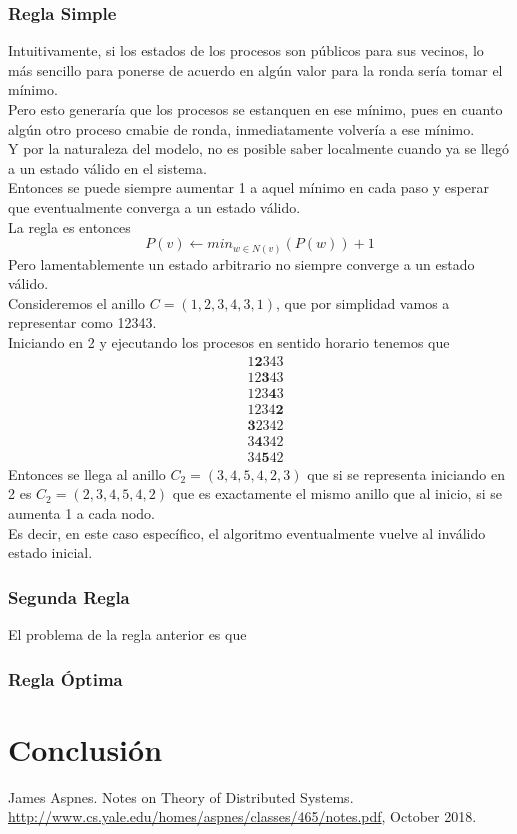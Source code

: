 \documentclass[12pt,a4paper]{article}
\begin{document}
{        \subsubsection{Regla Simple}{
        Intuitivamente, si los estados de los procesos son públicos para sus
        vecinos, lo más sencillo para ponerse de acuerdo en algún valor para la
        ronda sería tomar el mínimo.\\
        Pero esto generaría que los procesos se estanquen en ese mínimo, pues en
        cuanto algún otro proceso cmabie de ronda, inmediatamente volvería a ese
        mínimo.\\
        Y por la naturaleza del modelo, no es posible saber localmente cuando ya
        se llegó a un estado válido en el sistema.\\
        Entonces se puede siempre aumentar 1 a aquel mínimo en cada paso y
        esperar que eventualmente converga a un estado válido.\\
        La regla es entonces
        \[P(v) \leftarrow min_{w \in N(v)}(P(w)) + 1\]
        Pero lamentablemente un estado arbitrario no siempre converge a un estado
        válido.\\
        Consideremos el anillo $C = (1, 2, 3, 4, 3, 1)$, que por simplidad
        vamos a representar como 12343.\\
        Iniciando en 2 y ejecutando los procesos en sentido horario tenemos que
        \begin{align*}
            &1\textbf{2}343 \\
            &12\textbf{3}43 \\
            &123\textbf{4}3 \\
            &1234\textbf{2} \\
            &\textbf{3}2342 \\
            &3\textbf{4}342 \\
            &34\textbf{5}42
        \end{align*}
        Entonces se llega al anillo $C_2 = (3, 4, 5, 4, 2, 3)$ que si se representa
        iniciando en 2 es $C_2 = (2, 3, 4, 5, 4, 2)$ que es exactamente el mismo
        anillo que al inicio, si se aumenta 1 a cada nodo.\\
        Es decir, en este caso específico, el algoritmo eventualmente vuelve al
        inválido estado inicial.
        }

        \subsubsection{Segunda Regla}{
        El problema de la regla anterior es que
        }

        \subsubsection{Regla Óptima}{}
}
\section{Conclusión}{}

\begin{thebibliography}{}

James Aspnes. Notes on Theory of Distributed Systems.
\href{http://www.cs.yale.edu/homes/aspnes/classes/465/notes.pdf}
{http://www.cs.yale.edu/homes/aspnes/classes/465/notes.pdf}, October 2018.

\end{thebibliography}
\end{document}
